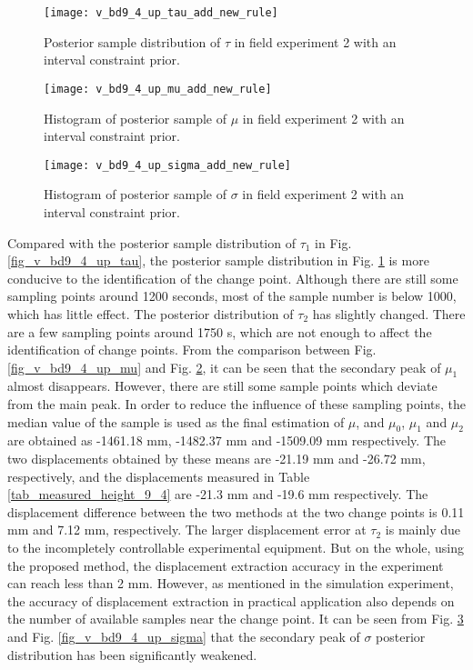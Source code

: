\documentclass[final,3p,times]{elsarticle}
\begin{document}
	\begin{figure}[htbp]
		\centering
		\texttt{[image: v\_bd9\_4\_up\_tau\_add\_new\_rule]}
		\caption{Posterior sample distribution of $\tau$ in field experiment 2 with an interval constraint prior.}
		\label{fig_v_bd9_4_up_tau_add_new_rule}
	\end{figure} 
	\begin{figure}[htbp]
		\centering
		\texttt{[image: v\_bd9\_4\_up\_mu\_add\_new\_rule]}
		\caption{Histogram of posterior sample of $\mu$ in field experiment 2 with an interval constraint prior.}
		\label{fig_v_bd9_4_up_mu_add_new_rule}
	\end{figure} 
	\begin{figure}[htbp]
		\centering
		\texttt{[image: v\_bd9\_4\_up\_sigma\_add\_new\_rule]}
		\caption{Histogram of posterior sample of $\sigma$ in field experiment 2 with an interval constraint prior.}
		\label{fig_v_bd9_4_up_sigma_add_new_rule}
	\end{figure}
	Compared with the posterior sample distribution of $\tau_1$ in Fig. \ref{fig_v_bd9_4_up_tau}, the posterior sample distribution in Fig. \ref{fig_v_bd9_4_up_tau_add_new_rule} is more conducive to the identification of the change point.
	Although there are still some sampling points around 1200 seconds, most of the sample number is below 1000, which has little effect.
	The posterior distribution of $\tau_2$ has slightly changed. 
	There are a few sampling points around 1750 s, which are not enough to affect the identification of change points.
	From the comparison between Fig. \ref{fig_v_bd9_4_up_mu} and Fig. \ref{fig_v_bd9_4_up_mu_add_new_rule}, it can be seen that the secondary peak of $\mu_1$ almost disappears.
	However, there are still some sample points which deviate from the main peak.
	In order to reduce the influence of these sampling points, the median value of the sample is used as the final estimation of \textbf{$\mu$}, and $\mu_0$, $\mu_1$ and $\mu_2$ are obtained as -1461.18 mm, -1482.37 mm and -1509.09 mm respectively.
	The two displacements obtained by these means are -21.19 mm and -26.72 mm, respectively, and the displacements measured in Table \ref{tab_measured_height_9_4} are -21.3 mm and -19.6 mm respectively.  
	The displacement difference between the two methods at the two change points is 0.11 mm and 7.12 mm, respectively. 
	The larger displacement error at $\tau_2$ is mainly due to the incompletely controllable experimental equipment. 
	But on the whole, using the proposed method, the displacement extraction accuracy in the experiment can reach less than 2 mm. However, as mentioned in the simulation experiment, the accuracy of displacement extraction in practical application also depends on the number of available samples near the change point.
	It can be seen from Fig. \ref{fig_v_bd9_4_up_sigma_add_new_rule} and Fig. \ref{fig_v_bd9_4_up_sigma} that the secondary peak of $\sigma$ posterior distribution has been significantly weakened.
	
\end{document}
